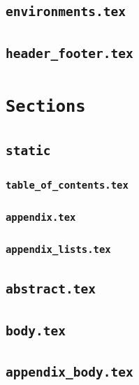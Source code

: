 \subsection{\texttt{environments.tex}}
\label{sec:environments.tex}

\subsection{\texttt{header\_footer.tex}}
\label{sec:header_footer.tex}

\section{\texttt{Sections}}
\label{sec:sections}

\subsection{\texttt{static}}
\label{sec:static}

\subsubsection{\texttt{table\_of\_contents.tex}}
\label{sec:table_of_contents.tex}

\subsubsection{\texttt{appendix.tex}}
\label{sec:appendix.tex}

\subsubsection{\texttt{appendix\_lists.tex}}
\label{sec:appendix_lists.tex}

\subsection{\texttt{abstract.tex}}
\label{sec:abstract.tex}

\subsection{\texttt{body.tex}}
\label{sec:body.tex}

\subsection{\texttt{appendix\_body.tex}}
\label{appendix_body.tex}

